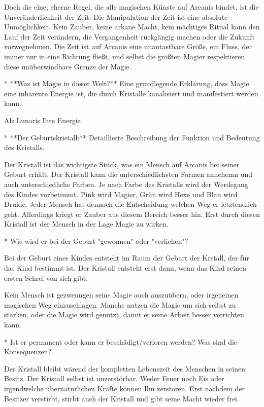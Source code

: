 \documentclass[10pt,a4paper,twocolumn,openany]{book}
\begin{document}
Doch die eine, eherne Regel, die alle magischen Künste auf Arcanis bindet, ist die Unveränderlichkeit der Zeit. Die Manipulation der Zeit ist eine absolute Unmöglichkeit. Kein Zauber, keine arkane Macht, kein mächtiges Ritual kann den Lauf der Zeit verändern, die Vergangenheit rückgängig machen oder die Zukunft vorwegnehmen. Die Zeit ist auf Arcanis eine unantastbare Größe, ein Fluss, der immer nur in eine Richtung fließt, und selbst die größten Magier respektieren diese unüberwindbare Grenze der Magie.


\clearpage




* **Was ist Magie in dieser Welt?** Eine grundlegende Erklärung, dass Magie eine inhärente Energie ist, die durch Kristalle kanalisiert und manifestiert werden kann.

Als Lunaris Ihre Energie 

* **Der Geburtskristall:** Detaillierte Beschreibung der Funktion und Bedeutung des Kristalls.

Der Kristall ist das wichtigste Stück, was ein Mensch auf Arcanis bei seiner Geburt erhält. Der Kristall kann die unterschiedlichsten Formen annehemn und auch unterschiedliche Farben.
Je nach Farbe des Kristalls wird der Werdegang des Kindes vorbetimmt. Pink wird Magier, Grün wird Hexe und Blau wird Druide. Jeder Mensch hat dennoch die Entscheidung welchen Weg er letztendlich geht. 
Allerdings kriegt er Zauber aus diesem Bereich besser hin. 
Erst durch diesen Kristall ist der Mensch in der Lage Magie zu wirken.


* Wie wird er bei der Geburt "gewonnen" oder "verliehen"?

Bei der Geburt eines Kindes entsteht im Raum der Geburt der Krstall, der für das Kind bestimmt ist. Der Kristall entsteht erst dann, wenn das Kind seinen ersten Schrei von sich gibt.

Kein Mensch ist gezweungen seine Magie auch auszuübern, oder irgeneinen magischen Weg einzuschlagen. Manche nutzen die Magie um sich selbst zu stärken, oder die Magie wird genutzt, damit er seine Arbeit besser verrichten kann.

* Ist er permanent oder kann er beschädigt/verloren werden? Was sind die Konsequenzen?

Der Kristall bleibt wärend der kompletten Lebenszeit des Menschen in seinen Besitz. Der Kristall selbst ist unzerstörbar. Weder Feuer noch Eis oder irgendwelche übernatürlichen Kräfte können Ihn zerstören. 
Erst nachdem der Besitzer verstirbt, stirbt auch der Kristall und gibt seine Macht wieder frei.
\end{document}
